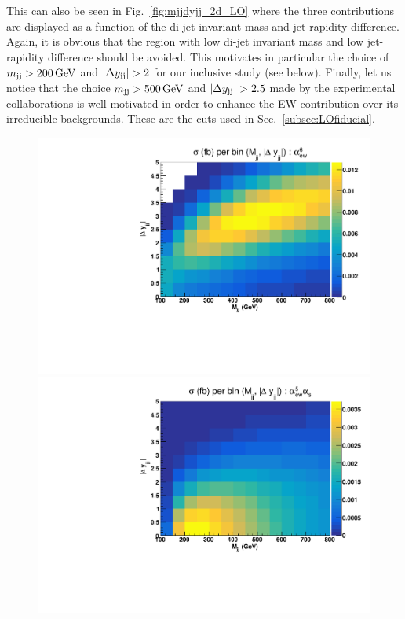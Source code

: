 This can also be seen in Fig.~\ref{fig:mjjdyjj_2d_LO} where the three contributions are displayed as a function of the di-jet invariant mass and jet rapidity difference.
Again, it is obvious that the region with low di-jet invariant mass and low jet-rapidity difference should be avoided.
This motivates in particular the choice of $m_{\text{j}\text{j}} > 200\,\text{GeV}$ and $|\Delta y_{\text{j}\text{j}}| > 2$ for our inclusive study (see below).
Finally, let us notice that the choice $m_{\text{j}\text{j}} > 500\,\text{GeV}$ and $|\Delta y_{\text{j}\text{j}}| > 2.5$ made by the experimental collaborations is well motivated in order to enhance the EW contribution over its irreducible backgrounds.
These are the cuts used in Sec.~\ref{subsec:LOfiducial}.

\begin{figure}[ht]
\centering
\includegraphics[scale=0.395]{figures/scanfigures/scan_ew6.pdf}
\includegraphics[scale=0.395]{figures/scanfigures/scan_ew5qcd1.pdf}

\end{figure}
